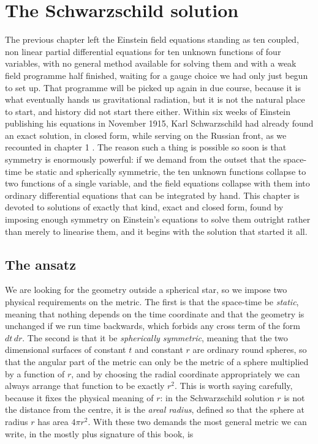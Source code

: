 \section{The Schwarzschild solution}

    The previous chapter left the Einstein field equations standing as ten coupled, non linear partial differential equations for ten unknown functions of four variables, with no general method available for solving them and with a weak field programme half finished, waiting for a gauge choice we had only just begun to set up. That programme will be picked up again in due course, because it is what eventually hands us gravitational radiation, but it is not the natural place to start, and history did not start there either. Within six weeks of Einstein publishing his equations in November 1915, Karl Schwarzschild had already found an exact solution, in closed form, while serving on the Russian front, as we recounted in chapter 1 \citep{schwarzschild1916}. The reason such a thing is possible so soon is that symmetry is enormously powerful: if we demand from the outset that the space-time be static and spherically symmetric, the ten unknown functions collapse to two functions of a single variable, and the field equations collapse with them into ordinary differential equations that can be integrated by hand. This chapter is devoted to solutions of exactly that kind, exact and closed form, found by imposing enough symmetry on Einstein's equations to solve them outright rather than merely to linearise them, and it begins with the solution that started it all.

    \subsection{The ansatz}

        We are looking for the geometry outside a spherical star, so we impose two physical requirements on the metric. The first is that the space-time be \textit{static}, meaning that nothing depends on the time coordinate and that the geometry is unchanged if we run time backwards, which forbids any cross term of the form $dt\,dr$. The second is that it be \textit{spherically symmetric}, meaning that the two dimensional surfaces of constant $t$ and constant $r$ are ordinary round spheres, so that the angular part of the metric can only be the metric of a sphere multiplied by a function of $r$, and by choosing the radial coordinate appropriately we can always arrange that function to be exactly $r^2$. This is worth saying carefully, because it fixes the physical meaning of $r$: in the Schwarzschild solution $r$ is not the distance from the centre, it is the \textit{areal radius}, defined so that the sphere at radius $r$ has area $4\pi r^2$. With these two demands the most general metric we can write, in the mostly plus signature of this book, is

